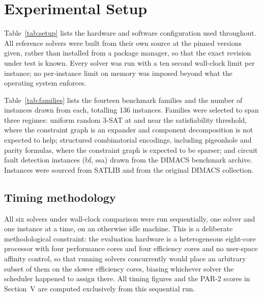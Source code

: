 \documentclass[conference]{IEEEtran}
\begin{document}
\section{Experimental Setup}

\begin{table}[t]
\caption{Evaluation hardware and software configuration}
\label{tab:setup}
\centering

\end{table}

Table~\ref{tab:setup} lists the hardware and software configuration used throughout. All
reference solvers were built from their own source at the pinned versions given, rather than
installed from a package manager, so that the exact revision under test is known. Every solver
was run with a ten second wall-clock limit per instance; no per-instance limit on memory was
imposed beyond what the operating system enforces.

\begin{table}[t]
\caption{Benchmark families}
\label{tab:families}
\centering

\end{table}

Table~\ref{tab:families} lists the fourteen benchmark families and the number of instances drawn
from each, totalling 136 instances. Families were selected to span three regimes: uniform random
3-SAT at and near the satisfiability threshold, where the constraint graph is an expander and
component decomposition is not expected to help; structured combinatorial encodings, including
pigeonhole and parity formulas, where the constraint graph is expected to be sparser; and circuit
fault detection instances (bf, ssa) drawn from the DIMACS benchmark archive. Instances were
sourced from SATLIB and from the original DIMACS collection.

\subsection{Timing methodology}

All six solvers under wall-clock comparison were run sequentially, one solver and one instance at
a time, on an otherwise idle machine. This is a deliberate methodological constraint: the
evaluation hardware is a heterogeneous eight-core processor with four performance cores and four
efficiency cores and no user-space affinity control, so that running solvers concurrently would
place an arbitrary subset of them on the slower efficiency cores, biasing whichever solver the
scheduler happened to assign there. All timing figures and the PAR-2 scores in Section~V are
computed exclusively from this sequential run.
\end{document}
